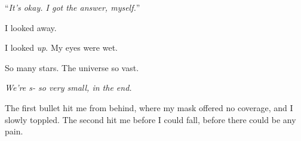 ``\emph{It's okay.  I got the answer, myself.}''



I looked away.



I looked \emph{up}.  My eyes were wet.



So many stars.  The universe so vast.



\emph{We're s- so very small, in the end.  }



The first bullet hit me from behind, where my mask offered no coverage, and I slowly toppled.  The second hit me before I could fall, before there could be any pain.





